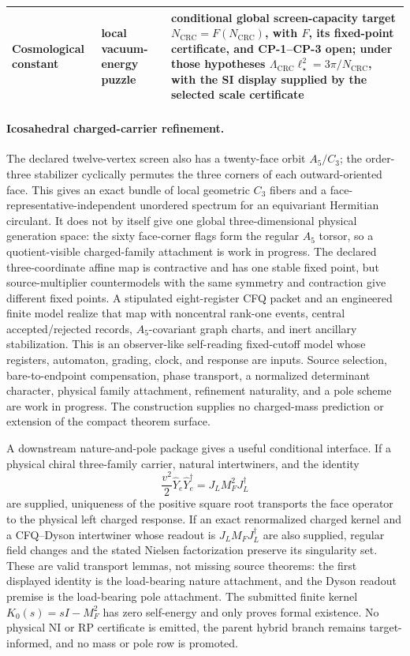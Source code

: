 \documentclass[11pt]{article}
\begin{document}
\begin{longtable}{@{}>{\raggedright\arraybackslash}p{}>{\raggedright\arraybackslash}p{}>{\raggedright\arraybackslash}p{}@{}}
Cosmological constant & local vacuum-energy puzzle & conditional global screen-capacity target \(N_{\mathrm{CRC}}=F(N_{\mathrm{CRC}})\), with \(F\), its fixed-point certificate, and CP-1--CP-3 open; under those hypotheses \(\Lambda_{\mathrm{CRC}}\ell_\star^2=3\pi/N_{\mathrm{CRC}}\), with the SI display supplied by the selected scale certificate \\
\bottomrule
\end{longtable}
\endgroup

\paragraph{Icosahedral charged-carrier refinement.}
The declared twelve-vertex screen also has a twenty-face orbit
\(A_5/C_3\); the order-three stabilizer cyclically permutes the three corners
of each outward-oriented face.  This gives an exact bundle of local geometric
\(C_3\) fibers and a face-representative-independent unordered spectrum for an
equivariant Hermitian circulant.  It does not by itself give one global
three-dimensional physical generation space: the sixty face-corner flags form
the regular \(A_5\) torsor, so a quotient-visible charged-family attachment is
work in progress.  The declared three-coordinate affine map is contractive and
has one stable fixed point, but source-multiplier countermodels with the same
symmetry and contraction give different fixed points.  A stipulated eight-register
CFQ packet and an engineered finite model realize that map with noncentral
rank-one events, central accepted/rejected records, \(A_5\)-covariant graph
charts, and inert ancillary stabilization.  This is an observer-like
self-reading fixed-cutoff model whose registers, automaton, grading, clock, and
response are inputs.  Source selection, bare-to-endpoint compensation, phase
transport, a normalized determinant character, physical family attachment,
refinement naturality, and a pole scheme are work in progress.  The construction
supplies no charged-mass prediction or extension of the compact theorem surface.

A downstream nature-and-pole package gives a useful conditional interface.
If a physical chiral three-family carrier, natural intertwiners, and the
identity
\[
 \frac{v^2}{2}\widehat Y_e\widehat Y_e^\dagger
 =J_LM_F^2J_L^\dagger
\]
are supplied, uniqueness of the positive square root transports the face
operator to the physical left charged response.  If an exact renormalized
charged kernel and a CFQ--Dyson intertwiner whose readout is
\(J_LM_FJ_L^\dagger\) are also supplied, regular field changes and the stated
Nielsen factorization preserve its singularity set.  These are valid transport
lemmas, not missing source theorems: the first displayed identity is the
load-bearing nature attachment, and the Dyson readout premise is the
load-bearing pole attachment.  The submitted finite kernel
\(K_0(s)=sI-M_F^2\) has zero self-energy and only proves formal existence.  No
physical NI or RP certificate is emitted, the parent hybrid branch remains
target-informed, and no mass or pole row is promoted.
\end{document}
